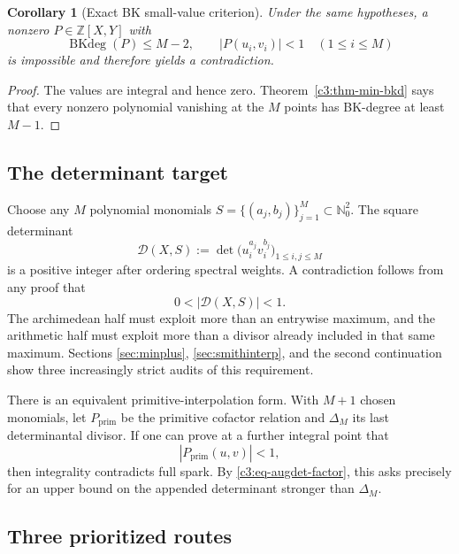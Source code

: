 \documentclass[11pt,oneside]{article}
\newtheorem{corollary}[theorem]{Corollary}
\theoremstyle{definition}
\theoremstyle{remark}
\newcommand{\Nzero}{\mathbb N_0}
\newcommand{\Z}{\mathbb Z}
\newcommand{\BKd}{\operatorname{BKdeg}}
\begin{document}
\begin{corollary}[Exact BK small-value criterion]
\label{c3:cor-bk-small-value}
Under the same hypotheses, a nonzero $P\in\Z[X,Y]$ with
\[
 \BKd(P)\le M-2,
 \qquad
 |P(u_i,v_i)|<1\quad(1\le i\le M)
\]
is impossible and therefore yields a contradiction.
\end{corollary}

\begin{proof}
The values are integral and hence zero.  Theorem~\ref{c3:thm-min-bkd} says that every
nonzero polynomial vanishing at the $M$ points has BK-degree at least $M-1$.
\end{proof}

\subsection{The determinant target}

Choose any $M$ polynomial monomials
$S=\{(a_j,b_j)\}_{j=1}^M\subset\Nzero^2$.  The square determinant
\begin{equation}
 \mathcal D(X,S):=
 \det\bigl(u_i^{a_j}v_i^{b_j}\bigr)_{1\le i,j\le M}
 \label{c3:eq-square-evaldet}
\end{equation}
is a positive integer after ordering spectral weights.  A contradiction follows from any
proof that
\begin{equation}
 0<|\mathcal D(X,S)|<1.
 \label{c3:eq-det-target}
\end{equation}
The archimedean half must exploit more than an entrywise maximum, and the arithmetic half must
exploit more than a divisor already included in that same maximum.  Sections
\ref{sec:minplus}, \ref{sec:smithinterp}, and the second continuation show three increasingly
strict audits of this requirement.

There is an equivalent primitive-interpolation form.  With $M+1$ chosen monomials, let
$P_{\mathrm{prim}}$ be the primitive cofactor relation and $\Delta_M$ its last determinantal
divisor.  If one can prove at a further integral point that
\[
 |P_{\mathrm{prim}}(u,v)|<1,
\]
then integrality contradicts full spark.  By \eqref{c3:eq-augdet-factor}, this asks precisely
for an upper bound on the appended determinant stronger than $\Delta_M$.

\subsection{Three prioritized routes}
\end{document}

